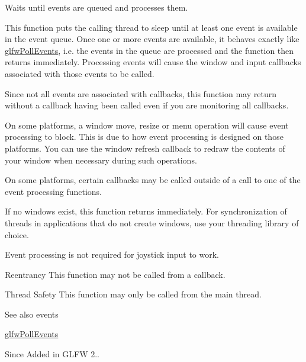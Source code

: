 Waits until events are queued and processes them. 

This function puts the calling thread to sleep until at least one event is available in the event queue. Once one or more events are available, it behaves exactly like \hyperlink{group__window_ga872d16e4c77f58c0436f356255920cfc}{glfw\+Poll\+Events}, i.\+e. the events in the queue are processed and the function then returns immediately. Processing events will cause the window and input callbacks associated with those events to be called.

Since not all events are associated with callbacks, this function may return without a callback having been called even if you are monitoring all callbacks.

On some platforms, a window move, resize or menu operation will cause event processing to block. This is due to how event processing is designed on those platforms. You can use the window refresh callback to redraw the contents of your window when necessary during such operations.

On some platforms, certain callbacks may be called outside of a call to one of the event processing functions.

If no windows exist, this function returns immediately. For synchronization of threads in applications that do not create windows, use your threading library of choice.

Event processing is not required for joystick input to work.

\begin{DoxyParagraph}{Reentrancy}
This function may not be called from a callback.
\end{DoxyParagraph}
\begin{DoxyParagraph}{Thread Safety}
This function may only be called from the main thread.
\end{DoxyParagraph}
\begin{DoxySeeAlso}{See also}
events 

\hyperlink{group__window_ga872d16e4c77f58c0436f356255920cfc}{glfw\+Poll\+Events}
\end{DoxySeeAlso}
\begin{DoxySince}{Since}
Added in G\+L\+F\+W 2.. 
\end{DoxySince}
